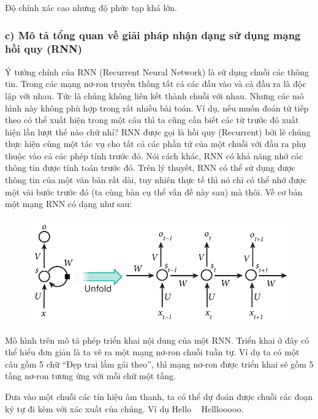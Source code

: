 \documentclass{article}
\begin{document}
	Độ chính xác cao nhưng độ phức tạp khá lớn.
	
	\subsubsection{c) Mô tả tổng quan về giải pháp nhận dạng sử dụng mạng hồi quy (RNN)}
	
	\qquad Ý tưởng chính của RNN (Recurrent Neural Network) là sử dụng chuỗi các thông tin. Trong các mạng nơ-ron truyền thống tất cả các đầu vào và cả đầu ra là độc lập với nhau. Tức là chúng không liên kết thành chuỗi với nhau. Nhưng các mô hình này không phù hợp trong rất nhiều bài toán. Ví dụ, nếu muốn đoán từ tiếp theo có thể xuất hiện trong một câu thì ta cũng cần biết các từ trước đó xuất hiện lần lượt thế nào chứ nhỉ? RNN được gọi là hồi quy (Recurrent) bởi lẽ chúng thực hiện cùng một tác vụ cho tất cả các phần tử của một chuỗi với đầu ra phụ thuộc vào cả các phép tính trước đó. Nói cách khác, RNN có khả năng nhớ các thông tin được tính toán trước đó. Trên lý thuyết, RNN có thể sử dụng được thông tin của một văn bản rất dài, tuy nhiên thực tế thì nó chỉ có thể nhớ được một vài bước trước đó (ta cùng bàn cụ thể vấn đề này sau) mà thôi. Về cơ bản một mạng RNN có dạng như sau:
	
	\begin{figure}[H]
		\centering
		\includegraphics[width=1\linewidth]{images/b3_4.png}
		\label{fig:writing-thesis}
	\end{figure} 

	Mô hình trên mô tả phép triển khai nội dung của một RNN. Triển khai ở đây có thể hiểu đơn giản là ta vẽ ra một mạng nơ-ron chuỗi tuần tự. Ví dụ ta có một câu gồm 5 chữ “Đẹp trai lắm gái theo”, thì mạng nơ-ron được triển khai sẽ gồm 5 tầng nơ-ron tương ứng với mỗi chữ một tầng. 
	
	Đưa vào một chuỗi các tín hiệu âm thanh, ta có thể dự đoán được chuỗi các đoạn ký tự đi kèm với xác xuất của chúng. Ví dụ Hello ~ Helllooooo.
	
\end{document}
